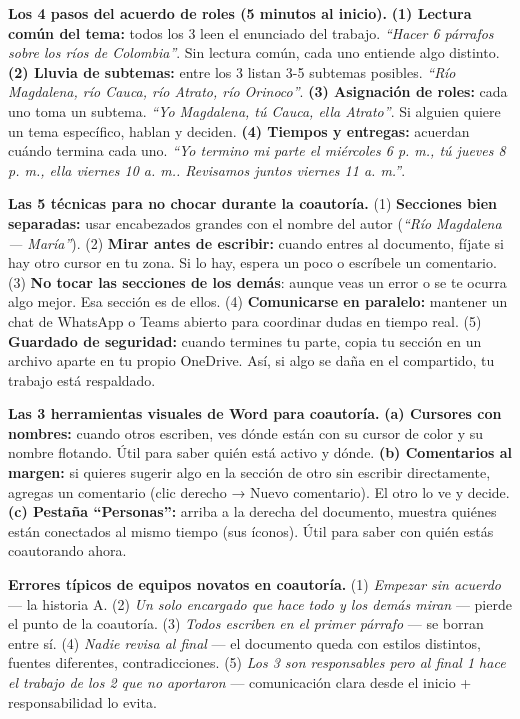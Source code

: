 \documentclass[11pt,letterpaper]{article}
\newcommand{\milcpaso}[3]{%
\Needspace{4\baselineskip}%
\begin{tcolorbox}[enhanced,colback=white,colframe=milcLinea,arc=1.5mm,boxrule=.9pt,
  left=14mm,right=4mm,top=3mm,bottom=3mm,before skip=4pt,after skip=4pt,
  fontupper=\RaggedRight,
  overlay={\node[anchor=north west,circle,fill=#2,text=white,inner sep=0pt,
    minimum size=7.4mm,font=\sffamily\bfseries\small]
    at ([xshift=3.6mm,yshift=-3.2mm]frame.north west) {#1};}]
#3
\end{tcolorbox}}
\begin{document}
\milcpaso{1}{milcTurquesa}{\textbf{Los 4 pasos del acuerdo de roles (5 minutos al inicio).} \textbf{(1) Lectura común del tema:} todos los 3 leen el enunciado del trabajo. \emph{``Hacer 6 párrafos sobre los ríos de Colombia''}. Sin lectura común, cada uno entiende algo distinto. \textbf{(2) Lluvia de subtemas:} entre los 3 listan 3-5 subtemas posibles. \emph{``Río Magdalena, río Cauca, río Atrato, río Orinoco''}. \textbf{(3) Asignación de roles:} cada uno toma un subtema. \emph{``Yo Magdalena, tú Cauca, ella Atrato''}. Si alguien quiere un tema específico, hablan y deciden. \textbf{(4) Tiempos y entregas:} acuerdan cuándo termina cada uno. \emph{``Yo termino mi parte el miércoles 6 p. m., tú jueves 8 p. m., ella viernes 10 a. m.. Revisamos juntos viernes 11 a. m.''}.}
\milcpaso{2}{milcTurquesa}{\textbf{Las 5 técnicas para no chocar durante la coautoría.} (1) \textbf{Secciones bien separadas:} usar encabezados grandes con el nombre del autor (\emph{``Río Magdalena --- María''}). (2) \textbf{Mirar antes de escribir:} cuando entres al documento, fíjate si hay otro cursor en tu zona. Si lo hay, espera un poco o escríbele un comentario. (3) \textbf{No tocar las secciones de los demás}: aunque veas un error o se te ocurra algo mejor. Esa sección es de ellos. (4) \textbf{Comunicarse en paralelo:} mantener un chat de WhatsApp o Teams abierto para coordinar dudas en tiempo real. (5) \textbf{Guardado de seguridad:} cuando termines tu parte, copia tu sección en un archivo aparte en tu propio OneDrive. Así, si algo se daña en el compartido, tu trabajo está respaldado.}
\milcpaso{3}{milcTurquesa}{\textbf{Las 3 herramientas visuales de Word para coautoría.} \textbf{(a) Cursores con nombres:} cuando otros escriben, ves dónde están con su cursor de color y su nombre flotando. Útil para saber quién está activo y dónde. \textbf{(b) Comentarios al margen:} si quieres sugerir algo en la sección de otro sin escribir directamente, agregas un comentario (clic derecho → Nuevo comentario). El otro lo ve y decide. \textbf{(c) Pestaña ``Personas'':} arriba a la derecha del documento, muestra quiénes están conectados al mismo tiempo (sus íconos). Útil para saber con quién estás coautorando ahora.}
\milcpaso{4}{milcTurquesa}{\textbf{Errores típicos de equipos novatos en coautoría.} (1) \emph{Empezar sin acuerdo} --- la historia A. (2) \emph{Un solo encargado que hace todo y los demás miran} --- pierde el punto de la coautoría. (3) \emph{Todos escriben en el primer párrafo} --- se borran entre sí. (4) \emph{Nadie revisa al final} --- el documento queda con estilos distintos, fuentes diferentes, contradicciones. (5) \emph{Los 3 son responsables pero al final 1 hace el trabajo de los 2 que no aportaron} --- comunicación clara desde el inicio + responsabilidad lo evita.}
\end{document}
